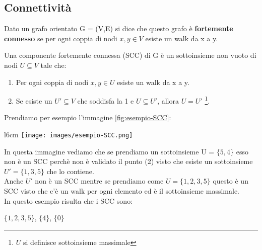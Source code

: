 \subsection{Connettività}
\begin{definition}\label{grafo-fortemente-connesso}
    Dato un grafo orientato G = (V,E) si dice che questo grafo è \textbf{fortemente connesso} se per ogni coppia di nodi $x,y \in V$ esiste un walk da x a y.
\end{definition}
\begin{definition}\label{componente-fortemente-connesso}
    Una componente fortemente connessa (SCC) di G è un sottoinsieme non vuoto di nodi $U \subseteq V$ tale che:
    \begin{enumerate}
        \item Per ogni coppia di nodi $x,y \in U$ esiste un walk da x a y.
        \item Se esiste un $U' \subseteq V$ che soddisfa la 1 e $U \subseteq U'$, allora $U = U'$ \footnote{$U$ si definisce sottoinsieme massimale}.
    \end{enumerate}
\end{definition}
\begin{example}
    Prendiamo per esempio l'immagine \ref{fig:esempio-SCC}:
\end{example}
\begin{wrapfigure}[9]{l}{6cm}
    \vspace{-10pt}
    \centering
    \texttt{[image: images/esempio-SCC.png]}
    \caption{Grafo con i suoi SCC}
    \label{fig:esempio-SCC}
\end{wrapfigure}
In questa immagine vediamo che se prendiamo un sottoinsieme U = $\{5,4\}$ esso non è un SCC perchè non è validato il punto (2) visto che esiste un sottoinsieme $U' = \{1,3,5\}$ che lo contiene. \\Anche $U'$ non è un SCC mentre se prendiamo come $U = \{1,2,3,5\}$ questo è un SCC visto che c'è un walk per ogni elemento ed è il sottoinsieme massimale.\\
In questo esempio risulta che i SCC sono: 
\begin{center}
    $\{1,2,3,5\}$, $\{4\}$, $\{0\}$
\end{center}

